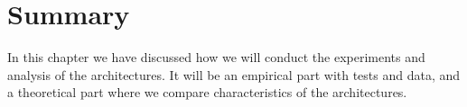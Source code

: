 \section{Summary}
In this chapter we have discussed how we will conduct the experiments and analysis of the architectures. It will be an empirical part with tests and data, and a theoretical part where we compare characteristics of the architectures.


